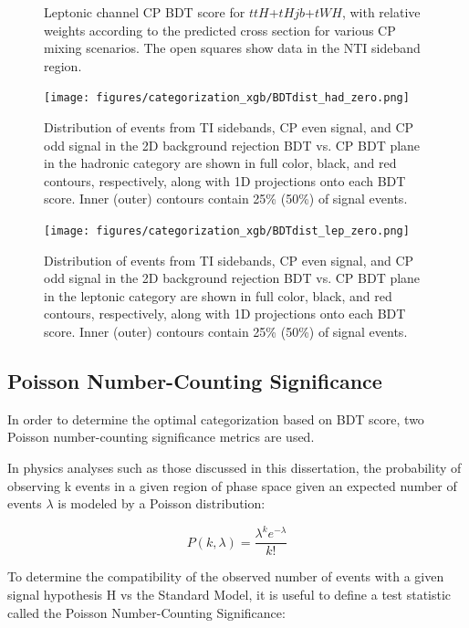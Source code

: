 \begin{figure}[htbp]
  \centering
  \caption{Leptonic channel CP BDT score for $ttH$+$tHjb$+$tWH$, with relative weights according to the predicted cross section for various CP mixing scenarios.  The open squares show data in the NTI sideband region. }
  \label{fig:cplep}
\end{figure}

\begin{figure}[htbp]
 \centering
  	\texttt{[image: figures/categorization\_xgb/BDTdist\_had\_zero.png]}
  \caption{Distribution of events from TI sidebands, CP even signal, and CP odd signal in the 2D background rejection BDT vs. CP BDT plane in the hadronic category are shown in full color, black, and red contours, respectively, along with 1D projections onto each BDT score. Inner (outer) contours contain 25\% (50\%) of signal events.}
  \label{fig:2dbdthad}
\end{figure}

\begin{figure}[htbp]
 \centering
  	\texttt{[image: figures/categorization\_xgb/BDTdist\_lep\_zero.png]}
  \caption{Distribution of events from TI sidebands, CP even signal, and CP odd signal in the 2D background rejection BDT vs. CP BDT plane  in the leptonic category are shown in full color, black, and red contours, respectively, along with 1D projections onto each BDT score. Inner (outer) contours contain 25\% (50\%) of signal events.}
  \label{fig:2dbdtlep}
\end{figure}


\subsection{Poisson Number-Counting Significance}
In order to determine the optimal categorization based on BDT score, two Poisson number-counting significance metrics are used.

In physics analyses such as those discussed in this dissertation, the probability of observing k events in a given region of phase space given an expected number of events $\lambda$ is modeled by a Poisson distribution:

\begin{equation}
P(k, \lambda) = \frac{\lambda^{k}e^{-\lambda}}{k!}
\end{equation}

To determine the compatibility of the observed number of events with a given signal hypothesis H vs the Standard Model, it is useful to define a test statistic called the Poisson Number-Counting Significance:

